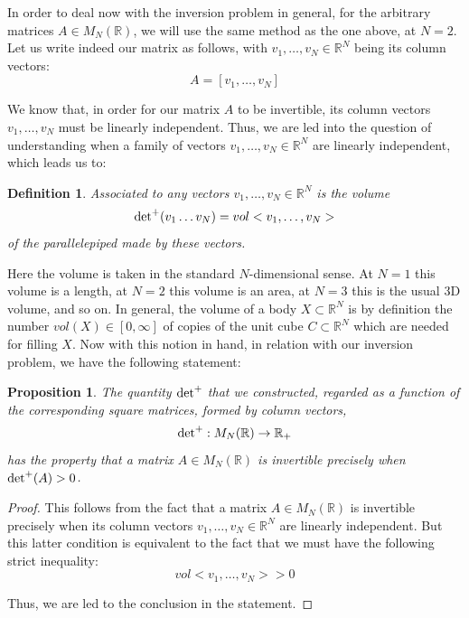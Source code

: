 \documentclass[12pt]{amsbook}
\newtheorem{definition}[theorem]{Definition}
\newtheorem{proposition}[theorem]{Proposition}
\begin{document}
In order to deal now with the inversion problem in general, for the arbitrary matrices $A\in M_N(\mathbb R)$, we will use the same method as the one above, at $N=2$. Let us write indeed our matrix as follows, with $v_1,\ldots,v_N\in\mathbb R^N$ being its column vectors:
$$A=[v_1,\ldots,v_N]$$

We know that, in order for our matrix $A$ to be invertible, its column vectors $v_1,\ldots,v_N$ must be linearly independent. Thus, we are led into the question of understanding when a family of vectors $v_1,\ldots,v_N\in\mathbb R^N$ are linearly independent, which leads us to:


\begin{definition}
Associated to any vectors $v_1,\ldots,v_N\in\mathbb R^N$ is the volume
$${\rm det}^+(v_1\ldots v_N)=vol<v_1,\ldots,v_N>$$
of the parallelepiped made by these vectors.
\end{definition}

Here the volume is taken in the standard $N$-dimensional sense. At $N=1$ this volume is a length, at $N=2$ this volume is an area, at $N=3$ this is the usual 3D volume, and so on. In general, the volume of a body $X\subset\mathbb R^N$ is by definition the number $vol(X)\in[0,\infty]$ of copies of the unit cube $C\subset\mathbb R^N$ which are needed for filling $X$. Now with this notion in hand, in relation with our inversion problem, we have the following statement:


\begin{proposition}
The quantity ${\rm det}^+$ that we constructed, regarded as a function of the corresponding square matrices, formed by column vectors,
$${\rm det}^+:M_N(\mathbb R)\to\mathbb R_+$$
has the property that a matrix $A\in M_N(\mathbb R)$ is invertible precisely when ${\rm det}^+(A)>0$.
\end{proposition}

\begin{proof}
This follows from the fact that a matrix $A\in M_N(\mathbb R)$ is invertible precisely when its column vectors $v_1,\ldots,v_N\in\mathbb R^N$ are linearly independent. But this latter condition is equivalent to the fact that we must have the following strict inequality: 
$$vol<v_1,\ldots,v_N>>0$$

Thus, we are led to the conclusion in the statement.
\end{proof}
\end{document}
